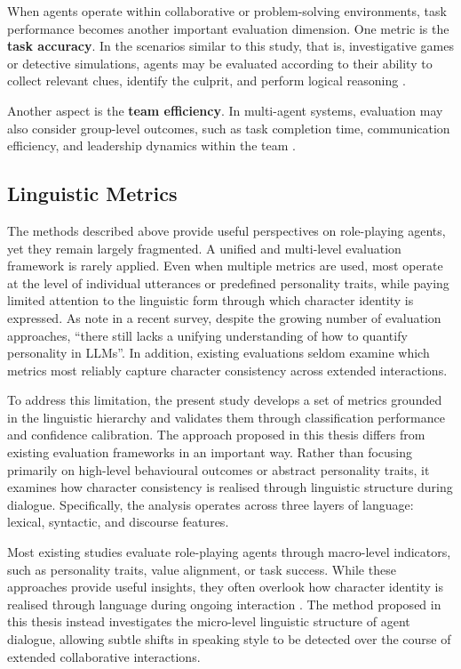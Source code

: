 \documentclass{article}
\begin{document}
When agents operate within collaborative or problem-solving environments, task performance becomes another important evaluation dimension. One metric is the \textbf{task accuracy}. In the scenarios similar to this study, that is, investigative games or detective simulations, agents may be evaluated according to their ability to collect relevant clues, identify the culprit, and perform logical reasoning \citep{wu2024jubensha}.

Another aspect is the \textbf{team efficiency}. In multi-agent systems, evaluation may also consider group-level outcomes, such as task completion time, communication efficiency, and leadership dynamics within the team \citep{guo2026collab}.


\subsection{Linguistic Metrics}

The methods described above provide useful perspectives on role-playing agents, yet they remain largely fragmented. A unified and multi-level evaluation framework is rarely applied. Even when multiple metrics are used, most operate at the level of individual utterances or predefined personality traits, while paying limited attention to the linguistic form through which character identity is expressed. As \cite{tseng2024two} note in a recent survey, despite the growing number of evaluation approaches, “there still lacks a unifying understanding of how to quantify personality in LLMs”. In addition, existing evaluations seldom examine which metrics most reliably capture character consistency across extended interactions.

To address this limitation, the present study develops a set of metrics grounded in the linguistic hierarchy and validates them through classification performance and confidence calibration. The approach proposed in this thesis differs from existing evaluation frameworks in an important way. Rather than focusing primarily on high-level behavioural outcomes or abstract personality traits, it examines how character consistency is realised through linguistic structure during dialogue. Specifically, the analysis operates across three layers of language: lexical, syntactic, and discourse features.

Most existing studies evaluate role-playing agents through macro-level indicators, such as personality traits, value alignment, or task success. While these approaches provide useful insights, they often overlook how character identity is realised through language during ongoing interaction \citep{shao2023characterllm, wang2024incharacter, wu2024jubensha}. The method proposed in this thesis instead investigates the micro-level linguistic structure of agent dialogue, allowing subtle shifts in speaking style to be detected over the course of extended collaborative interactions.
\end{document}
